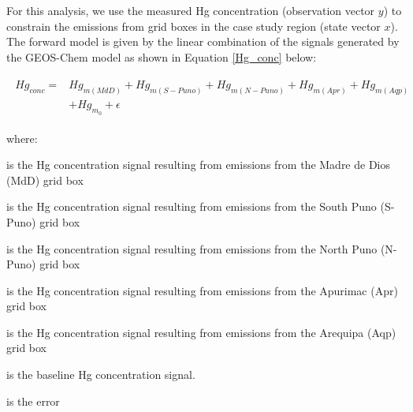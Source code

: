 \begin{flushleft}
For this analysis, we use the measured Hg concentration (observation vector $y$) to constrain the  emissions from grid boxes in the case study region (state vector $x$). The forward model is given by the linear combination of the signals generated by the GEOS-Chem model as shown in Equation \ref{Hg_conc} below:

\begin{align}
\begin{split}\label{Hg_conc}
Hg_{conc}= {}&Hg_{m(MdD)}+ Hg_{m(S-Puno)} + Hg_{m(N-Puno)} + Hg_{m(Apr)}+ Hg_{m(Aqp)}\\
            & +Hg_{m_0} + \epsilon
\end{split}
\end{align}

where:
\end{flushleft}

\begin{description}[leftmargin=!,labelwidth={5 em}]
    \item [$Hg_{m(MdD)}$] is the Hg concentration signal resulting from emissions from the Madre de Dios (MdD) grid box
    \item [$Hg_{m(S-Puno)}$] is the Hg concentration signal resulting from emissions from the South Puno (S-Puno) grid box
    \item [$Hg_{m(N-Puno)}$] is the Hg concentration signal resulting from emissions from the North Puno (N-Puno) grid box
    \item [$Hg_{m(Apr)}$] is the Hg concentration signal resulting from emissions from the Apurimac (Apr) grid box
    \item [$Hg_{m(Aqp)}$] is the Hg concentration signal resulting from emissions from the Arequipa (Aqp) grid box
    \item [$Hg_{m_0}$] is the baseline Hg concentration signal.
    \item [$\epsilon$] is the error
\end{description}


